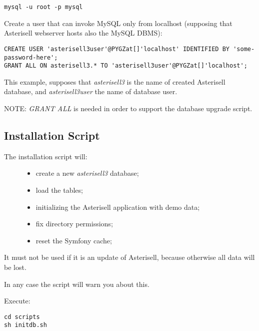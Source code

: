 \documentclass[letterpaper,10pt,english]{sphinxmanual}
\begin{document}
\begin{Verbatim}[commandchars=@\[\]]
mysql -u root -p mysql
\end{Verbatim}

Create a user that can invoke MySQL only from localhost (supposing that Asterisell webserver hosts also the MySQL DBMS):

\begin{Verbatim}[commandchars=@\[\]]
CREATE USER 'asterisell3user'@PYGZat[]'localhost' IDENTIFIED BY 'some-password-here';
GRANT ALL ON asterisell3.* TO 'asterisell3user'@PYGZat[]'localhost';
\end{Verbatim}

This example, supposes that \emph{asterisell3} is the name of created Asterisell database, and \emph{asterisell3user} the name of database user.

NOTE: \emph{GRANT ALL} is needed in order to support the database upgrade script.


\subsection{Installation Script}
\label{index:installation-script}\begin{description}
\item[{The installation script will:}] \leavevmode\begin{itemize}
\item {} 
create a new \emph{asterisell3} database;

\item {} 
load the tables;

\item {} 
initializing the Asterisell application with demo data;

\item {} 
fix directory permissions;

\item {} 
reset the Symfony cache;

\end{itemize}

\end{description}

It must not be used if it is an update of Asterisell, because otherwise all data will be lost.

In any case the script will warn you about this.

Execute:

\begin{Verbatim}[commandchars=@\[\]]
cd scripts
sh initdb.sh
\end{Verbatim}
\end{document}
